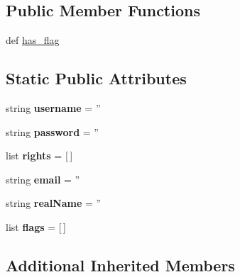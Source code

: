 \subsection*{Public Member Functions}
\begin{DoxyCompactItemize}
\item 
def \hyperlink{classcheshire3_1_1base_objects_1_1_user_aa7cf19e5629759f1ea4832046e2787d7}{has\-\_\-flag}
\end{DoxyCompactItemize}
\subsection*{Static Public Attributes}
\begin{DoxyCompactItemize}
\item 
\hypertarget{classcheshire3_1_1base_objects_1_1_user_a6b394560ec402e3b3e91e1a40aaa8206}{string {\bfseries username} = ''}\label{classcheshire3_1_1base_objects_1_1_user_a6b394560ec402e3b3e91e1a40aaa8206}

\item 
\hypertarget{classcheshire3_1_1base_objects_1_1_user_aaf93b27d4d47b463b2a6a2f59928b3bc}{string {\bfseries password} = ''}\label{classcheshire3_1_1base_objects_1_1_user_aaf93b27d4d47b463b2a6a2f59928b3bc}

\item 
\hypertarget{classcheshire3_1_1base_objects_1_1_user_a46abfe5569d30aca086f35f76c80895c}{list {\bfseries rights} = \mbox{[}$\,$\mbox{]}}\label{classcheshire3_1_1base_objects_1_1_user_a46abfe5569d30aca086f35f76c80895c}

\item 
\hypertarget{classcheshire3_1_1base_objects_1_1_user_a91f7a81da22d515ba93f9a074bacefa8}{string {\bfseries email} = ''}\label{classcheshire3_1_1base_objects_1_1_user_a91f7a81da22d515ba93f9a074bacefa8}

\item 
\hypertarget{classcheshire3_1_1base_objects_1_1_user_a9bb518560689fe0f11aa19dc63fa1828}{string {\bfseries real\-Name} = ''}\label{classcheshire3_1_1base_objects_1_1_user_a9bb518560689fe0f11aa19dc63fa1828}

\item 
\hypertarget{classcheshire3_1_1base_objects_1_1_user_af3c262dc603855401887583e678fc809}{list {\bfseries flags} = \mbox{[}$\,$\mbox{]}}\label{classcheshire3_1_1base_objects_1_1_user_af3c262dc603855401887583e678fc809}

\end{DoxyCompactItemize}
\subsection*{Additional Inherited Members}


